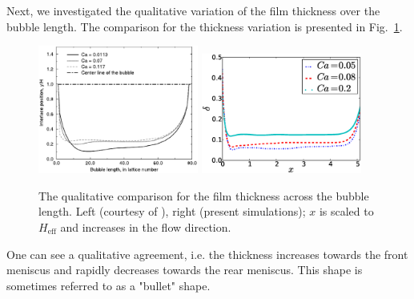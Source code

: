 \documentclass[preprint,12pt]{elsarticle}
\begin{document}
Next, we investigated the qualitative variation of the film thickness over the bubble length.
The comparison for the thickness variation is presented in Fig.~\ref{fig:sehgal:bubble:length}.
\begin{figure}
\includegraphics[width=0.47\textwidth]{Figures/Bubble/bubble_sehgal.eps}\hfill
\includegraphics[width=0.47\textwidth]{Figures/Bubble/bubble_length.eps}\\
\caption{The qualitative comparison for the film thickness across
the bubble length. Left (courtesy of \citet{sehgal-microchannel}),
right (present simulations); $x$ is scaled to $H_{\mathrm{eff}}$
and increases in the flow direction.\label{fig:sehgal:bubble:length}}
\end{figure}
One can see a qualitative agreement, i.e. the thickness increases towards the front meniscus and
rapidly decreases towards the rear meniscus. This shape is sometimes referred to as a "bullet" shape.
\end{document}
